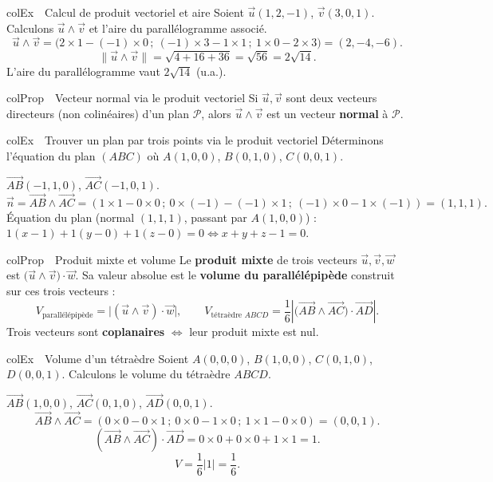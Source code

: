 \documentclass[11pt,a4paper]{article}
\newenvironment{propriete}[1][Propriété]
  {\begin{fiche}{colProp}{\ding{72}~~#1}}{\end{fiche}}
\newenvironment{exemple}[1][Exemple]
  {\begin{fiche}{colEx}{\ding{217}~~#1}}{\end{fiche}}
\begin{document}
\begin{exemple}[Calcul de produit vectoriel et aire]
Soient $\vec u(1,2,-1)$, $\vec v(3,0,1)$. Calculons $\vec u\wedge\vec v$ et l'aire du parallélogramme associé.
\[
  \vec u\wedge\vec v = \bigl(2\times1-(-1)\times0\,;\ (-1)\times3-1\times1\,;\ 1\times0-2\times3\bigr) = (2,-4,-6).
\]
\[
  \|\vec u\wedge\vec v\| = \sqrt{4+16+36} = \sqrt{56} = 2\sqrt{14}.
\]
L'aire du parallélogramme vaut $2\sqrt{14}$ (u.a.).
\end{exemple}

\begin{propriete}[Vecteur normal via le produit vectoriel]
Si $\vec u,\vec v$ sont deux vecteurs directeurs (non colinéaires) d'un plan $\mathcal{P}$, alors $\vec u\wedge\vec v$ est un vecteur \textbf{normal} à $\mathcal{P}$.
\end{propriete}

\begin{exemple}[Trouver un plan par trois points via le produit vectoriel]
Déterminons l'équation du plan $(ABC)$ où $A(1,0,0)$, $B(0,1,0)$, $C(0,0,1)$.

\smallskip
$\overrightarrow{AB}(-1,1,0)$, $\overrightarrow{AC}(-1,0,1)$.
\[
  \vec n = \overrightarrow{AB}\wedge\overrightarrow{AC} = (1\times1-0\times0\,;\ 0\times(-1)-(-1)\times1\,;\ (-1)\times0-1\times(-1)) = (1,1,1).
\]
Équation du plan (normal $(1,1,1)$, passant par $A(1,0,0)$) : $1(x-1)+1(y-0)+1(z-0)=0\iff x+y+z-1=0$.
\end{exemple}

\begin{propriete}[Produit mixte et volume]
Le \textbf{produit mixte} de trois vecteurs $\vec u,\vec v,\vec w$ est $\bigl(\vec u\wedge\vec v\bigr)\cdot\vec w$. Sa valeur absolue est le \textbf{volume du parallélépipède} construit sur ces trois vecteurs :
\[
  V_{\text{parallélépipède}} = \bigl|(\vec u\wedge\vec v)\cdot\vec w\bigr|, \qquad
  V_{\text{tétraèdre } ABCD} = \frac16\left|\bigl(\overrightarrow{AB}\wedge\overrightarrow{AC}\bigr)\cdot\overrightarrow{AD}\right|.
\]
Trois vecteurs sont \textbf{coplanaires} $\iff$ leur produit mixte est nul.
\end{propriete}

\begin{exemple}[Volume d'un tétraèdre]
Soient $A(0,0,0)$, $B(1,0,0)$, $C(0,1,0)$, $D(0,0,1)$. Calculons le volume du tétraèdre $ABCD$.

\smallskip
$\overrightarrow{AB}(1,0,0)$, $\overrightarrow{AC}(0,1,0)$, $\overrightarrow{AD}(0,0,1)$.
\[
  \overrightarrow{AB}\wedge\overrightarrow{AC} = (0\times0-0\times1\,;\ 0\times0-1\times0\,;\ 1\times1-0\times0) = (0,0,1).
\]
\[
  (\overrightarrow{AB}\wedge\overrightarrow{AC})\cdot\overrightarrow{AD} = 0\times0+0\times0+1\times1 = 1.
\]
\[
  V = \frac16|1| = \frac16.
\]
\end{exemple}
\end{document}
